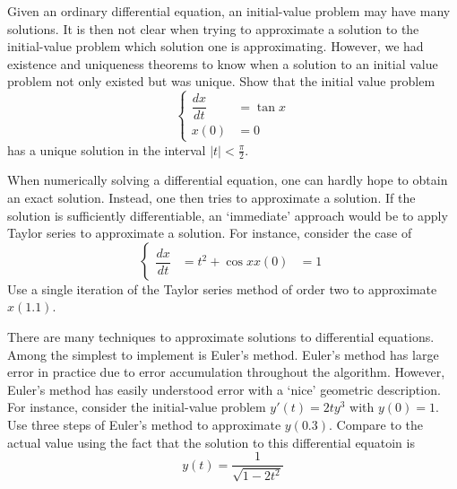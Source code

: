 \documentclass[11pt,letterpaper]{article}
\begin{document}


 Given an ordinary differential equation, an initial-value problem may have many solutions. It is then not clear when trying to approximate a solution to the initial-value problem which solution one is approximating. However, we had existence and uniqueness theorems to know when a solution to an initial value problem not only existed but was unique. Show that the initial value problem
	\[
	\left\{
	\begin{aligned}
	\dfrac{dx}{dt}&= \tan x \\
	x(0)&= 0
	\end{aligned} \right.
	\]
has a unique solution in the interval $|t| < \frac{\pi}{2}$. 



\newpage



 When numerically solving a differential equation, one can hardly hope to obtain an exact solution. Instead, one then tries to approximate a solution. If the solution is sufficiently differentiable, an `immediate' approach would be to apply Taylor series to approximate a solution. For instance, consider the case of 
	\[
	\left\{
	\begin{aligned}
	\dfrac{dx}{dt}&= t^2 + \cos x
	x(0)&= 1
	\end{aligned} \right.
	\]
Use a single iteration of the Taylor series method of order two to approximate $x(1.1)$. 



\newpage



 There are many techniques to approximate solutions to differential equations. Among the simplest to implement is Euler's method. Euler's method has large error in practice due to error accumulation throughout the algorithm. However, Euler's method has easily understood error with a `nice' geometric description. For instance, consider the initial-value problem $y'(t)= 2t y^3$ with $y(0)= 1$. Use three steps of Euler's method to approximate $y(0.3)$. Compare to the actual value using the fact that the solution to this differential equatoin is 
	\[
	y(t)= \dfrac{1}{\sqrt{1 - 2t^2}}
	\]
\end{document}
